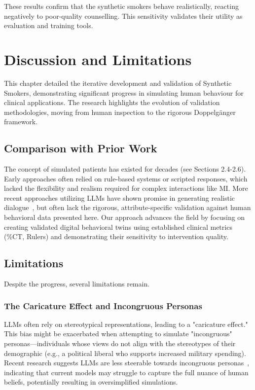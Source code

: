 These results confirm that the synthetic smokers behave realistically, reacting negatively to poor-quality counselling. This sensitivity validates their utility as evaluation and training tools.

\section{Discussion and Limitations}

This chapter detailed the iterative development and validation of Synthetic Smokers, demonstrating significant progress in simulating human behaviour for clinical applications. The research highlights the evolution of validation methodologies, moving from human inspection to the rigorous Doppelgänger framework.

\subsection{Comparison with Prior Work}

The concept of simulated patients has existed for decades (see Sections 2.4-2.6). Early approaches often relied on rule-based systems or scripted responses, which lacked the flexibility and realism required for complex interactions like MI. More recent approaches utilizing LLMs have shown promise in generating realistic dialogue~\citep{cheng2023gpatients}, but often lack the rigorous, attribute-specific validation against human behavioral data presented here. Our approach advances the field by focusing on creating validated digital behavioral twins using established clinical metrics (\%CT, Rulers) and demonstrating their sensitivity to intervention quality.

\subsection{Limitations}

Despite the progress, several limitations remain.

\subsubsection{The Caricature Effect and Incongruous Personas}

LLMs often rely on stereotypical representations, leading to a "caricature effect." This bias might be exacerbated when attempting to simulate "incongruous" personas—individuals whose views do not align with the stereotypes of their demographic (e.g., a political liberal who supports increased military spending). Recent research suggests LLMs are less steerable towards incongruous personas~\citep{liu2024evaluating}, indicating that current models may struggle to capture the full nuance of human beliefs, potentially resulting in oversimplified simulations.


